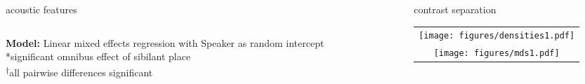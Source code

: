 \documentclass[serif, mathserif, final, xcolor=table]{beamer}
\begin{document}
\begin{frame}[t]{}
\begin{columns}[t]
\begin{column}{0.72\linewidth}
\begin{columns}[t]
\begin{column}{0.69\linewidth}
\begin{block}{acoustic features}
\begin{columns}
\begin{column}{0.3\linewidth}
                  {\footnotesize
                   \textbf{Model:} Linear mixed effects regression with 
                   Speaker as random intercept \\
                    *significant omnibus effect of sibilant place \\
                   \textsuperscript{$\dagger$}all pairwise differences significant}
                  \bigskip
              \end{column}

            \end{columns}

          \end{block}
       
        \end{column}

        \begin{column}{0.001\linewidth}        
        \end{column}

        \begin{column}{0.29\linewidth}

          \begin{block}{contrast separation}
            \begin{tabular}{c}
              \hspace{1.4cm}\texttt{[image: figures/densities1.pdf]} \\[0.2cm]
              \hspace{-1.5cm}\texttt{[image: figures/mds1.pdf]} \\
            \end{tabular}
          \end{block}

        \end{column}


\end{columns}
\end{column}
\end{columns}
\end{frame}
\end{document}
